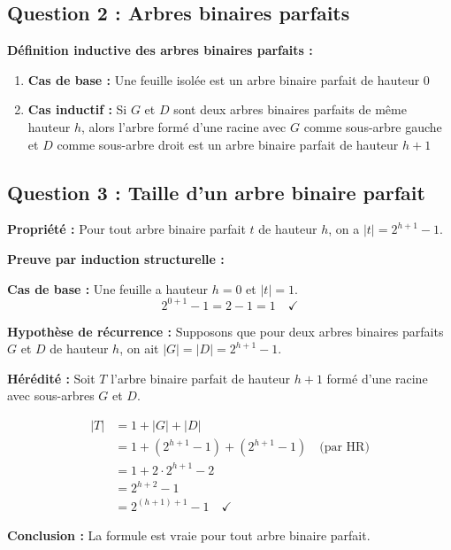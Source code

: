 \documentclass[12pt,a4paper]{article}
\begin{document}
\subsection{Question 2 : Arbres binaires parfaits}

\begin{correction}
\textbf{Définition inductive des arbres binaires parfaits :}

\begin{enumerate}
    \item \textbf{Cas de base :} Une feuille isolée est un arbre binaire parfait de hauteur 0
    \item \textbf{Cas inductif :} Si $G$ et $D$ sont deux arbres binaires parfaits de même hauteur $h$, alors l'arbre formé d'une racine avec $G$ comme sous-arbre gauche et $D$ comme sous-arbre droit est un arbre binaire parfait de hauteur $h+1$
\end{enumerate}
\end{correction}

\subsection{Question 3 : Taille d'un arbre binaire parfait}

\begin{demonstration}
\textbf{Propriété :} Pour tout arbre binaire parfait $t$ de hauteur $h$, on a $|t| = 2^{h+1} - 1$.

\textbf{Preuve par induction structurelle :}

\textbf{Cas de base :} Une feuille a hauteur $h = 0$ et $|t| = 1$.
$$2^{0+1} - 1 = 2 - 1 = 1 \quad ✓$$

\textbf{Hypothèse de récurrence :} Supposons que pour deux arbres binaires parfaits $G$ et $D$ de hauteur $h$, on ait $|G| = |D| = 2^{h+1} - 1$.

\textbf{Hérédité :} Soit $T$ l'arbre binaire parfait de hauteur $h+1$ formé d'une racine avec sous-arbres $G$ et $D$.

\begin{align*}
|T| &= 1 + |G| + |D| \\
&= 1 + (2^{h+1} - 1) + (2^{h+1} - 1) \quad \text{(par HR)} \\
&= 1 + 2 \cdot 2^{h+1} - 2 \\
&= 2^{h+2} - 1 \\
&= 2^{(h+1)+1} - 1 \quad ✓
\end{align*}

\textbf{Conclusion :} La formule est vraie pour tout arbre binaire parfait.
\end{demonstration}
\end{document}
